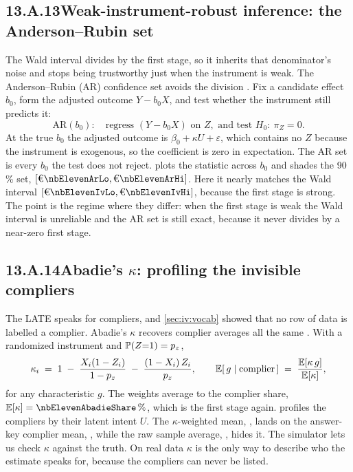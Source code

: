 \subsection*{13.A.13\quad Weak-instrument-robust inference: the Anderson--Rubin set}

The Wald interval divides by the first stage, so it inherits that denominator's noise and stops
being trustworthy just when the instrument is weak. The Anderson--Rubin (AR) confidence set avoids
the division \citep{anderson1949}. Fix a candidate effect $b_0$, form the adjusted outcome
$Y - b_0 X$, and test whether the instrument still predicts it:
%
\begin{equation}
  \text{AR}(b_0): \quad \text{regress } (Y - b_0 X) \text{ on } Z, \text{ and test } H_0:\ \pi_Z = 0 .
  \label{eq:iv:ar}
\end{equation}
%
At the true $b_0$ the adjusted outcome is $\beta_0 + \kappa U + \varepsilon$, which contains no $Z$
because the instrument is exogenous, so the coefficient is zero in expectation. The AR set is every
$b_0$ the test does not reject.  plots the statistic across $b_0$ and shades the
90\,\% set, $[\eur{\nbElevenArLo}, \eur{\nbElevenArHi}]$. Here it nearly matches the Wald interval
$[\eur{\nbElevenIvLo}, \eur{\nbElevenIvHi}]$, because the first stage is strong. The point is the
regime where they differ: when the first stage is weak the Wald interval is unreliable and the AR
set is still exact, because it never divides by a near-zero first stage.



\subsection*{13.A.14\quad Abadie's $\kappa$: profiling the invisible compliers}

The LATE speaks for compliers, and \cref{sec:iv:vocab} showed that no row of data is labelled a
complier. Abadie's $\kappa$ recovers complier averages all the same \citep{abadie2003kappa}. With a
randomized instrument and $\operatorname{\mathbb{P}}(Z{=}1) = p_z$,
%
\begin{equation}
  \kappa_i \;=\; 1 \;-\; \frac{X_i(1 - Z_i)}{1 - p_z} \;-\; \frac{(1 - X_i)\,Z_i}{p_z},
  \qquad
  \operatorname{\mathbb{E}}[\,g \mid \text{complier}\,] \;=\; \frac{\operatorname{\mathbb{E}}[\kappa\, g]}{\operatorname{\mathbb{E}}[\kappa]},
  \label{eq:iv:kappa}
\end{equation}
%
for any characteristic $g$. The weights average to the complier share, $\E[\kappa] =
\pc{\nbElevenAbadieShare}$, which is the first stage again.  profiles the
compliers by their latent intent $U$. The $\kappa$-weighted mean, \nbElevenAbUKappa, lands on the
answer-key complier mean, \nbElevenAbUTrue, while the raw sample average, \nbElevenAbUAll, hides it.
The simulator lets us check $\kappa$ against the truth. On real data $\kappa$ is the only way to
describe who the estimate speaks for, because the compliers can never be listed.

